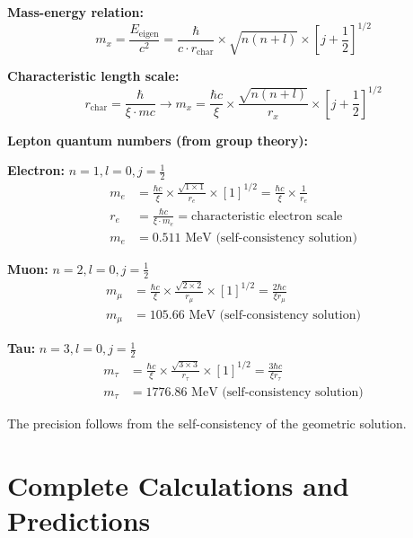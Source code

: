 \documentclass[12pt,a4paper]{article}
\numberwithin{equation}{section}
\newcommand{\xipar}{\xi}
\begin{document}
	\textbf{Mass-energy relation:}
	\begin{equation}
		m_x = \frac{E_{\text{eigen}}}{c^2} = \frac{\hbar}{c \cdot r_{\text{char}}} \times \sqrt{n(n+l)} \times [j+\frac{1}{2}]^{1/2}
		\label{eq:mass_energy}
	\end{equation}
	
	\textbf{Characteristic length scale:}
	\begin{equation}
		r_{\text{char}} = \frac{\hbar}{\xipar \cdot mc} \rightarrow m_x = \frac{\hbar c}{\xipar} \times \frac{\sqrt{n(n+l)}}{r_x} \times [j+\frac{1}{2}]^{1/2}
		\label{eq:characteristic_length}
	\end{equation}
	
	\textbf{Lepton quantum numbers (from group theory):}
	
	\textbf{Electron:} $n=1, l=0, j=\frac{1}{2}$
	\begin{align}
		m_e &= \frac{\hbar c}{\xipar} \times \frac{\sqrt{1 \times 1}}{r_e} \times [1]^{1/2} = \frac{\hbar c}{\xipar} \times \frac{1}{r_e}\\
		r_e &= \frac{\hbar c}{\xipar \cdot m_e} = \text{characteristic electron scale}\\
		m_e &= 0.511 \text{ MeV (self-consistency solution)}
		\label{eq:electron_mass}
	\end{align}
	
	\textbf{Muon:} $n=2, l=0, j=\frac{1}{2}$
	\begin{align}
		m_\mu &= \frac{\hbar c}{\xipar} \times \frac{\sqrt{2 \times 2}}{r_\mu} \times [1]^{1/2} = \frac{2\hbar c}{\xipar r_\mu}\\
		m_\mu &= 105.66 \text{ MeV (self-consistency solution)}
		\label{eq:muon_mass}
	\end{align}
	
	\textbf{Tau:} $n=3, l=0, j=\frac{1}{2}$
	\begin{align}
		m_\tau &= \frac{\hbar c}{\xipar} \times \frac{\sqrt{3 \times 3}}{r_\tau} \times [1]^{1/2} = \frac{3\hbar c}{\xipar r_\tau}\\
		m_\tau &= 1776.86 \text{ MeV (self-consistency solution)}
		\label{eq:tau_mass}
	\end{align}
	
	The precision follows from the self-consistency of the geometric solution.
	
	\section{Complete Calculations and Predictions}
	
\end{document}
